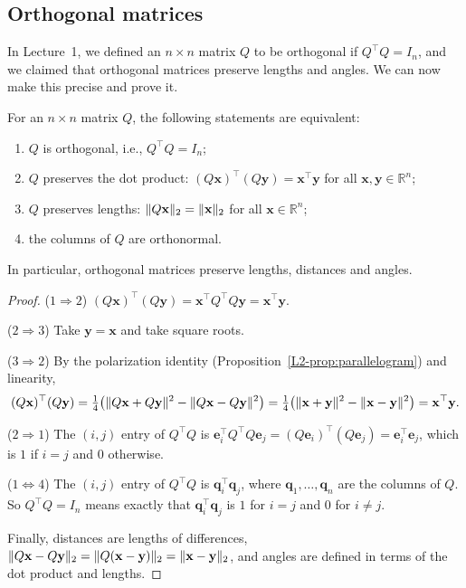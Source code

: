 \subsection{Orthogonal matrices}

In Lecture~1, we defined an $n \times n$ matrix $Q$ to be orthogonal if $Q^\top Q = I_n$, and we claimed that orthogonal matrices preserve lengths and angles. We can now make this precise and prove it.

\begin{theorem}\label{L2-thm:orthogonal}
    For an $n \times n$ matrix $Q$, the following statements are equivalent:
    \begin{enumerate}
        \item $Q$ is orthogonal, i.e., $Q^\top Q = I_n$;
        \item $Q$ preserves the dot product: $(Q\mathbf{x})^\top (Q\mathbf{y}) = \mathbf{x}^\top \mathbf{y}$ for all $\mathbf{x}, \mathbf{y} \in \mathbb{R}^n$;
        \item $Q$ preserves lengths: $\lVert Q\mathbf{x} \rVert_2 = \lVert \mathbf{x} \rVert_2$ for all $\mathbf{x} \in \mathbb{R}^n$;
        \item the columns of $Q$ are orthonormal.
    \end{enumerate}
    In particular, orthogonal matrices preserve lengths, distances and angles.
\end{theorem}

\begin{proof}
    ($1 \Rightarrow 2$) $(Q\mathbf{x})^\top (Q\mathbf{y}) = \mathbf{x}^\top Q^\top Q \mathbf{y} = \mathbf{x}^\top \mathbf{y}$.

    ($2 \Rightarrow 3$) Take $\mathbf{y} = \mathbf{x}$ and take square roots.

    ($3 \Rightarrow 2$) By the polarization identity (Proposition~\ref{L2-prop:parallelogram}) and linearity,
    \[(Q\mathbf{x})^\top (Q\mathbf{y}) = \tfrac{1}{4}\big(\lVert Q\mathbf{x} + Q\mathbf{y} \rVert^2 - \lVert Q\mathbf{x} - Q\mathbf{y} \rVert^2\big) = \tfrac{1}{4}\big(\lVert \mathbf{x} + \mathbf{y} \rVert^2 - \lVert \mathbf{x} - \mathbf{y} \rVert^2\big) = \mathbf{x}^\top \mathbf{y}.\]

    ($2 \Rightarrow 1$) The $(i, j)$ entry of $Q^\top Q$ is $\mathbf{e}_i^\top Q^\top Q \mathbf{e}_j = (Q\mathbf{e}_i)^\top (Q\mathbf{e}_j) = \mathbf{e}_i^\top \mathbf{e}_j$, which is $1$ if $i = j$ and $0$ otherwise.

    ($1 \Leftrightarrow 4$) The $(i, j)$ entry of $Q^\top Q$ is $\mathbf{q}_i^\top \mathbf{q}_j$, where $\mathbf{q}_1, \ldots, \mathbf{q}_n$ are the columns of $Q$. So $Q^\top Q = I_n$ means exactly that $\mathbf{q}_i^\top \mathbf{q}_j$ is $1$ for $i = j$ and $0$ for $i \neq j$.

    Finally, distances are lengths of differences, $\lVert Q\mathbf{x} - Q\mathbf{y} \rVert_2 = \lVert Q(\mathbf{x} - \mathbf{y}) \rVert_2 = \lVert \mathbf{x} - \mathbf{y} \rVert_2$, and angles are defined in terms of the dot product and lengths.
\end{proof}

